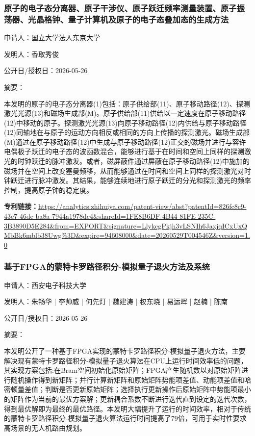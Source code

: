 \documentclass[12pt,a4paper]{ctexart}
\begin{document}
\subsubsection{ 原子的电子态分离器、原子干涉仪、原子跃迁频率测量装置、原子振荡器、光晶格钟、量子计算机及原子的电子态叠加态的生成方法 }

申请人：国立大学法人东京大学

发明人：香取秀俊

公开日/授权日：2026-05-26

摘要：

本发明的原子的电子态分离器(1)包括：原子供给部(11)、原子移动路径(12)、探测激光光源(13)和磁场生成部(M)。原子供给部(11)供给以一定速度在原子移动路径(12)中移动的原子。探测激光光源(13)向原子移动路径(12)内供给与原子移动路径(12)同轴地在与原子的运动方向相反或相同的方向上传播的探测激光。磁场生成部(M)通过在原子移动路径(12)中生成与原子移动路径(12)正交的磁场并进行与容许电偶极子跃迁的电子态的波函数混合，能够进行基于在时间和空间上同样的探测激光的时钟跃迁的脉冲激发。或者，磁屏蔽件通过屏蔽在原子移动路径(12)中施加的磁场并在空间上改变塞曼频移，从而能够通过在时间和空间上同样的探测激光对时钟跃迁进行脉冲激发。其结果，能够连续地进行原子跃迁的分光和探测激光的频率控制，提高原子钟的稳定度。

\noindent\textbf{专利链接：}\url{https://analytics.zhihuiya.com/patent-view/abst?patentId=826fc8c9-43e7-46de-ba8a-7944a1978dc4&shareId=1FE8B6DF-4B44-81FE-235C-3B3890D5E284&from=EXPORT&signature=LlykcgPkjh3vLSNIh6JaxjqICxUxQMbBk6mblb38Uwg%3D&expire=94608000&date=20260529T004546Z&version=1.0}

\subsubsection{ 基于FPGA的蒙特卡罗路径积分-模拟量子退火方法及系统 }

申请人：西安电子科技大学

发明人：朱畅华 | 李帅威 | 何先灯 | 魏建涛 | 权东晓 | 易运晖 | 赵楠 | 陈南

公开日/授权日：2026-05-26

摘要：

本发明公开了一种基于FPGA实现的蒙特卡罗路径积分‑模拟量子退火方法，主要解决现有蒙特卡罗路径积分‑模拟量子退火算法在CPU上运行时间效率低的问题，其实现方案包括:在Bram空间初始化原始矩阵；FPGA产生随机数以对原始矩阵进行随机操作得到新矩阵；并行计算新矩阵和原始矩阵势能项差值、动能项差值和哈密顿量差值；判断是否更新原始矩阵；选择执行更新操作后原始矩阵中势能项最小的矩阵作为当前的最优方案解；更新耦合系数不断进行迭代直到设定的迭代次数，得到最优解即为最终的最优路径。本发明大幅提升了运行的时间效率，相对于传统的蒙特卡罗路径积分‑模拟量子退火算法运行时间提高了79倍，可用于实时性要求高场景的无人机路由规划。
\end{document}
